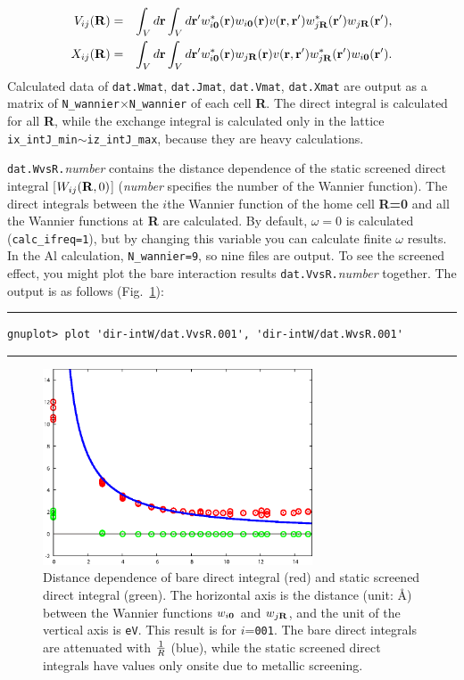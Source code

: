 \documentclass{article}
\begin{document}
\begin{eqnarray}
V_{ij}({\bf R})&=&\int_V d{\bf r} \int_V  d{\bf r'}
w_{i{\bf 0}}^*({\bf r}) 
w_{i{\bf 0}}({\bf r}) 
v({\bf r,r'}) 
w_{j{\bf R}}^*({\bf r'}) 
w_{j{\bf R}}({\bf r'}), \label{Vij} \\
X_{ij}({\bf R})&=&\int_V  d{\bf r}\int_V d{\bf r'}
w_{i{\bf 0}}^*({\bf r}) 
w_{j{\bf R}}({\bf r}) 
v({\bf r,r'}) 
w_{j{\bf R}}^*({\bf r'}) 
w_{i{\bf 0}}({\bf r'}). \label{Kij}
\end{eqnarray}
Calculated data of \verb+dat.Wmat+, \verb+dat.Jmat+, \verb+dat.Vmat+, \verb+dat.Xmat+ are output as a matrix of {\tt N\_wannier}$\times${\tt N\_wannier} of each cell {\bf R}. The direct integral is calculated for all {\bf R}, while the exchange integral is calculated only in the lattice {\tt ix\_intJ\_min}$\sim${\tt iz\_intJ\_max}, because they are heavy calculations. 

{\tt dat.WvsR.}{\it number} contains the distance dependence of the static screened direct integral [$W_{ij}({\bf R},0)$] ({\it number} specifies the number of the Wannier function). The direct integrals between the $i$the Wannier function of the home cell {\bf R=0} and all the Wannier functions at {\bf R} are calculated. By default, $\omega=0$ is calculated (\verb+calc_ifreq=1+), but by changing this variable you can calculate finite $\omega$ results. In the Al calculation, \verb+N_wannier=9+, so nine files are output. To see the screened effect, you might plot the bare interaction results {\tt dat.VvsR.}{\it number} together. The output is as follows (Fig.~\ref{WvsR}):
\vspace{3mm}\hrule
\begin{verbatim}
gnuplot> plot 'dir-intW/dat.VvsR.001', 'dir-intW/dat.WvsR.001'  
\end{verbatim}
\hrule\vspace{3mm}
\begin{figure}[H] 
\centering
\includegraphics[width=8cm]{WvsR-Al.eps}
\caption{Distance dependence of bare direct integral (red) and static screened direct integral (green). The horizontal axis is the distance (unit: \AA) between the Wannier functions $w_{i{\bf 0}}$ and $w_{j{\bf R}}$, and the unit of the vertical axis is {\tt eV}. This result is for $i$={\tt 001}. The bare direct integrals are attenuated with ${\Huge \frac{1}{R}}$ (blue), while the static screened direct integrals have values only onsite due to metallic screening.}
\label{WvsR}
\end{figure}
\end{document}
